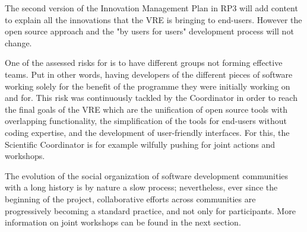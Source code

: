 The second version of the Innovation Management Plan in RP3 will add content
to explain all the innovations that the VRE is bringing to end-users.
However the open source approach and the "by users for users"
development process will not change.

One of the assessed risks for
\ODK is to have different groups not forming effective teams. Put in
other words, having developers of the different pieces of software
working solely for the benefit of the programme they were initially
working on and for. This risk was continuously tackled by the
Coordinator in order to reach the final goals of the VRE which are the
unification of open source tools with overlapping functionality, the
simplification of the tools for end-users without coding expertise,
and the development of user-friendly interfaces. For this, the
Scientific Coordinator is for example wilfully pushing for joint
actions and workshops.

The evolution of the social organization of software development
communities with a long history is by nature a slow process;
nevertheless, ever since the beginning of the project, collaborative
efforts across communities are progressively becoming a standard
practice, and not only for \ODK participants. More information on
joint workshops can be found in the next section.


